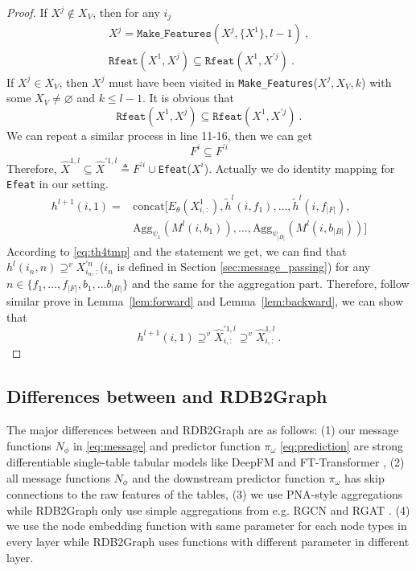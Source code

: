 \begin{proof}
    If $X^j \notin X_V$, then for any $i_j$
    \begin{gather*}
        X^j=\texttt{Make\_Features}(X^j, \{X^1\}, l-1)~,\\
        \texttt{Rfeat}(X^1, X^j)\subseteq \texttt{Rfeat}(X^1, X^{'j})~.
    \end{gather*}
    If $X^j \in X_V$, then $X^j$ must have been visited in \texttt{Make\_Features}($X^j, X_V, k$) with some $X_V\neq\varnothing$ and $k\leq l-1$. It is obvious that 
    $$
        \texttt{Rfeat}(X^1, X^j)\subseteq \texttt{Rfeat}(X^1, X^{'j})~.
    $$
    We can repeat a similar process in line 11-16, then we can get
    $$
    F^i\subseteq F^{'i}
    $$
    Therefore,  $\hat{X}^{1, l}\subseteq\hat{X}^{'1, l}\triangleq F^{'i}\cup$\texttt{Efeat}($X^{i}$). Actually we do identity mapping for \texttt{Efeat} in our setting.
    \begin{align*}
        h^{l+1}(i,1)=&\text{concat}[E_\theta(X^1_{i,:}), \tilde{h}^{l}(i, f_1), \ldots , \tilde{h}^{l}(i, f_{|F|}),\\
        &\text{Agg}_{\psi_1}(M^{l}(i, b_1)), \ldots,\text{Agg}_{\psi_{|B|}}(M^{l}(i, b_{|B|}))]    
    \end{align*}
    According to \eqref{eq:th4tmp} and the statement we get, we can find that $h^{l}(i_n, n)\supseteq^v X^{'n}_{i_n,:}$($i_n$ is defined in Section \ref{sec:message_passing}) for any $n\in\{f_1,\ldots,f_{|F|}, b_1,\ldots b_{|B|}\}$ and the same for the aggregation part.
    Therefore, follow similar prove in Lemma~\ref{lem:forward} and Lemma~\ref{lem:backward}, we can show that 
    $$
    h^{l+1}(i,1)\supseteq^v\hat{X}^{'1,l}_{i, :} \supseteq^v \hat{X}^{1, l}_{i, :}~.
    $$
    

    

    
    

\end{proof}

\subsection{Differences between \model{} and RDB2Graph}

The major differences between \model{} and RDB2Graph are as follows: (1) our message functions $N_\phi$ in \eqref{eq:message} and predictor function $\pi_\omega$ \eqref{eq:prediction} are strong differentiable single-table tabular models like DeepFM \cite{guo2017deepfm} and FT-Transformer \cite{gorishniy2021revisiting}, (2) all message functions $N_\phi$ and the downstream predictor function $\pi_\omega$ has skip connections to the raw features of the tables, (3) we use PNA-style aggregations while RDB2Graph only use simple aggregations from e.g. RGCN \cite{schlichtkrull2018modeling} and RGAT \cite{busbridge2019relational}. (4) we use the node embedding function with same parameter for each node types in every layer while RDB2Graph uses functions with different parameter in different layer.  

